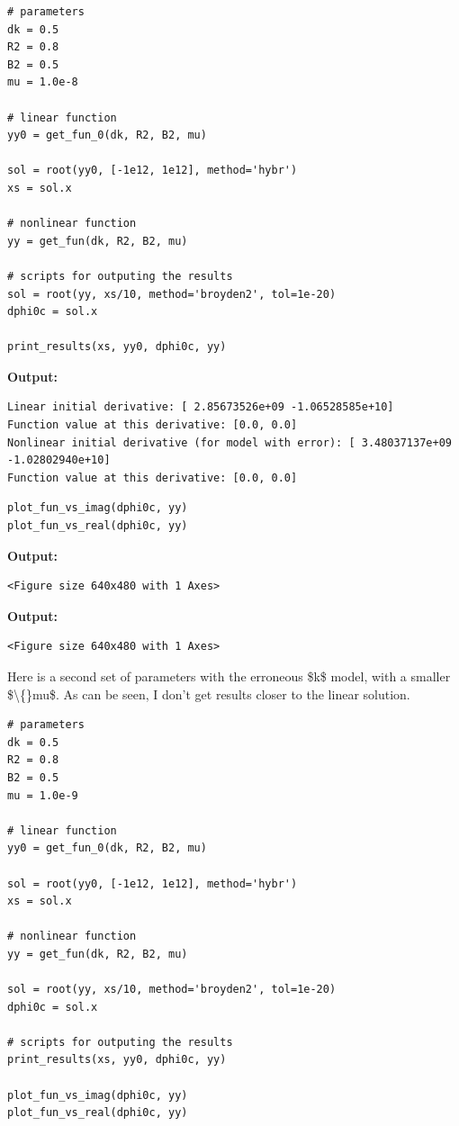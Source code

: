 \documentclass{article}
\begin{document}
\begin{lstlisting}
# parameters
dk = 0.5
R2 = 0.8
B2 = 0.5
mu = 1.0e-8

# linear function
yy0 = get_fun_0(dk, R2, B2, mu)

sol = root(yy0, [-1e12, 1e12], method='hybr')
xs = sol.x

# nonlinear function
yy = get_fun(dk, R2, B2, mu)

# scripts for outputing the results
sol = root(yy, xs/10, method='broyden2', tol=1e-20)
dphi0c = sol.x

print_results(xs, yy0, dphi0c, yy)\end{lstlisting}

\textbf{Output:}\begin{verbatim}
Linear initial derivative: [ 2.85673526e+09 -1.06528585e+10]
Function value at this derivative: [0.0, 0.0]
Nonlinear initial derivative (for model with error): [ 3.48037137e+09 -1.02802940e+10]
Function value at this derivative: [0.0, 0.0]

\end{verbatim}

\begin{lstlisting}
plot_fun_vs_imag(dphi0c, yy)
plot_fun_vs_real(dphi0c, yy)\end{lstlisting}

\textbf{Output:}\begin{verbatim}
<Figure size 640x480 with 1 Axes>
\end{verbatim}

\textbf{Output:}\begin{verbatim}
<Figure size 640x480 with 1 Axes>
\end{verbatim}

Here is a second set of parameters with the erroneous \$k\$ model, with a smaller \$\textbackslash\{\}mu\$. As can be seen, I don't get results closer to the linear solution.

\begin{lstlisting}
# parameters
dk = 0.5
R2 = 0.8
B2 = 0.5
mu = 1.0e-9

# linear function
yy0 = get_fun_0(dk, R2, B2, mu)

sol = root(yy0, [-1e12, 1e12], method='hybr')
xs = sol.x

# nonlinear function
yy = get_fun(dk, R2, B2, mu)

sol = root(yy, xs/10, method='broyden2', tol=1e-20)
dphi0c = sol.x

# scripts for outputing the results
print_results(xs, yy0, dphi0c, yy)

plot_fun_vs_imag(dphi0c, yy)
plot_fun_vs_real(dphi0c, yy)\end{lstlisting}
\end{document}
